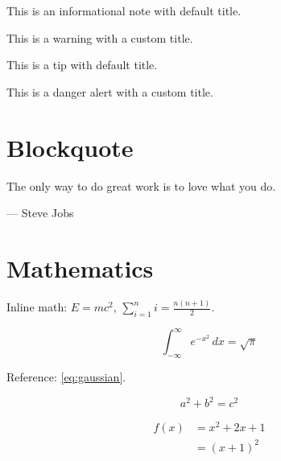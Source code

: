 \documentclass[a4paper,12pt]{article}
\begin{document}
\begin{bluebox}
    This is an informational note with default title.
\end{bluebox}

\begin{amberbox}
    This is a warning with a custom title.
\end{amberbox}

\begin{greenbox}
    This is a tip with default title.
\end{greenbox}

\begin{redbox}
    This is a danger alert with a custom title.
\end{redbox}

\section{Blockquote}

\begin{blockquote}
    The only way to do great work is to love what you do.

    --- Steve Jobs
\end{blockquote}

\section{Mathematics}

Inline math: $E = mc^2$, $\sum_{i=1}^{n} i = \frac{n(n+1)}{2}$.

\begin{equation}
    \int_{-\infty}^{\infty} e^{-x^2} \, dx = \sqrt{\pi}
    \label{eq:gaussian}
\end{equation}

Reference: \cref{eq:gaussian}.

\[
    a^2 + b^2 = c^2
\]

\begin{align}
    f(x) & = x^2 + 2x + 1     \label{eq:fx} \\
         & = (x + 1)^2         \nonumber
\end{align}
\end{document}
